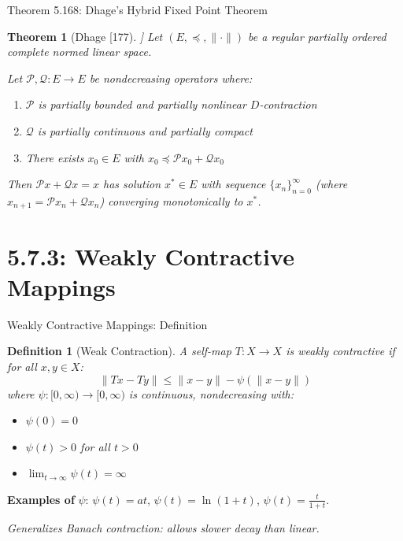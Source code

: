 \documentclass[aspectratio=169,10pt]{beamer}
\theoremstyle{plain}
\newtheorem*{theorem*}{Theorem}
\newtheorem*{definition*}{Definition}
\begin{document}
\begin{frame}{Theorem 5.168: Dhage's Hybrid Fixed Point Theorem}
  \begin{theorem*}[Dhage [177]]
    Let $(E, \preceq, \|\cdot\|)$ be a regular partially ordered complete normed linear space.

    Let $\mathcal{P}, \mathcal{Q}: E \to E$ be nondecreasing operators where:
    \begin{enumerate}
      \item $\mathcal{P}$ is partially bounded and partially nonlinear $D$-contraction
      \item $\mathcal{Q}$ is partially continuous and partially compact
      \item There exists $x_0 \in E$ with $x_0 \preceq \mathcal{P}x_0 + \mathcal{Q}x_0$
    \end{enumerate}

    Then $\mathcal{P}x + \mathcal{Q}x = x$ has solution $x^* \in E$ with sequence
    $\{x_n\}_{n=0}^{\infty}$ (where $x_{n+1} = \mathcal{P}x_n + \mathcal{Q}x_n$)
    converging monotonically to $x^*$.
  \end{theorem*}
\end{frame}

\section{5.7.3: Weakly Contractive Mappings}

\begin{frame}{Weakly Contractive Mappings: Definition}
  \begin{definition*}[Weak Contraction]
    A self-map $T: X \to X$ is weakly contractive if for all $x, y \in X$:
    $$\|Tx - Ty\| \leq \|x - y\| - \psi(\|x - y\|)$$
    where $\psi: [0,\infty) \to [0,\infty)$ is continuous, nondecreasing with:
    \begin{itemize}
      \item $\psi(0) = 0$
      \item $\psi(t) > 0$ for all $t > 0$
      \item $\lim_{t \to \infty} \psi(t) = \infty$
    \end{itemize}
  \end{definition*}

  \vspace{1em}

  \textbf{Examples of} $\psi$: $\psi(t) = at$, $\psi(t) = \ln(1+t)$, $\psi(t) = \frac{t}{1+t}$.

  \vspace{0.5em}

  \textit{Generalizes Banach contraction: allows slower decay than linear.}
\end{frame}
\end{document}
